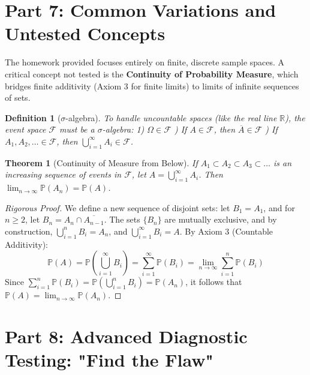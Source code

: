 \documentclass[11pt]{article}
\newtheorem{theorem}{Theorem}[section]
\newtheorem{definition}{Definition}[section]
\begin{document}
\section{Part 7: Common Variations and Untested Concepts}

The homework provided focuses entirely on finite, discrete sample spaces. A critical concept not tested is the \textbf{Continuity of Probability Measure}, which bridges finite additivity (Axiom 3 for finite limits) to limits of infinite sequences of sets.

\begin{definition}[$\sigma$-algebra]
To handle uncountable spaces (like the real line $\mathbb{R}$), the event space $\mathcal{F}$ must be a $\sigma$-algebra:
1) $\Omega \in \mathcal{F}$ ) If $A \in \mathcal{F}$, then $\overline{A} \in \mathcal{F}$ ) If $A_1, A_2, \dots \in \mathcal{F}$, then $\bigcup_{i=1}^\infty A_i \in \mathcal{F}$.
\end{definition}

\begin{theorem}[Continuity of Measure from Below]
If $A_1 \subset A_2 \subset A_3 \subset \dots$ is an increasing sequence of events in $\mathcal{F}$, let $A = \bigcup_{i=1}^\infty A_i$. Then $\lim_{n \to \infty} \mathbb{P}(A_n) = \mathbb{P}(A)$.
\end{theorem}
\begin{proof}[Rigorous Proof]
We define a new sequence of disjoint sets: let $B_1 = A_1$, and for $n \ge 2$, let $B_n = A_n \cap \overline{A_{n-1}}$. 
The sets $\{B_n\}$ are mutually exclusive, and by construction, $\bigcup_{i=1}^n B_i = A_n$, and $\bigcup_{i=1}^\infty B_i = A$.
By Axiom 3 (Countable Additivity):
\[ \mathbb{P}(A) = \mathbb{P}\left(\bigcup_{i=1}^\infty B_i\right) = \sum_{i=1}^\infty \mathbb{P}(B_i) = \lim_{n \to \infty} \sum_{i=1}^n \mathbb{P}(B_i) \]
Since $\sum_{i=1}^n \mathbb{P}(B_i) = \mathbb{P}\left(\bigcup_{i=1}^n B_i\right) = \mathbb{P}(A_n)$, it follows that $\mathbb{P}(A) = \lim_{n \to \infty} \mathbb{P}(A_n)$.
\end{proof}

\section{Part 8: Advanced Diagnostic Testing: "Find the Flaw"}
\end{document}
